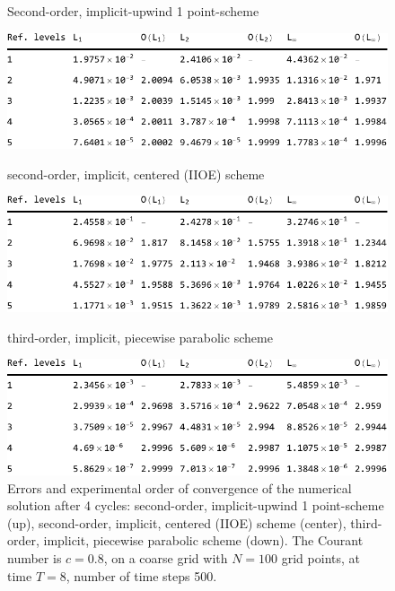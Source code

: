 \documentclass[../thesis.tex]{subfiles}
\begin{document}
\begin{figure}[H]
	\centering
    \caption*{Second-order, implicit-upwind 1 point-scheme}
	\includegraphics[width=\textwidth]{../tab/tab-1point-c0p8-T8-limit0-smooth.pdf}
    \caption*{second-order, implicit, centered (IIOE) scheme}
	\includegraphics[width=\textwidth]{../tab/tab-iioe-c0p8-T8-limit0-smooth.pdf}
    \caption*{third-order, implicit, piecewise parabolic scheme}
	\includegraphics[width=\textwidth]{../tab/tab-implicit-ppm-c0p8-T8-limit0-smooth.pdf}
	\caption{Errors and experimental order of convergence of the numerical solution after 4 cycles: second-order, implicit-upwind 1 point-scheme (up), second-order, implicit, centered (IIOE) scheme (center), third-order, implicit, piecewise parabolic scheme (down). The Courant number is \(c = 0.8\), on a coarse grid with \(N = 100\) grid points, at time \(T = 8\), number of time steps 500.}
	\label{tab:c0p8-T8-limit0-smooth}
\end{figure}
\end{document}
